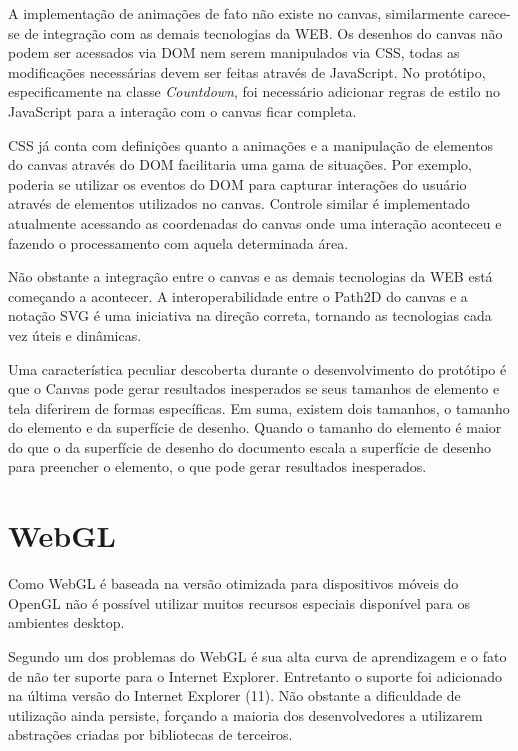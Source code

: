 A implementação de animações de fato não existe no canvas,
similarmente carece-se de integração com as demais tecnologias
da WEB. Os desenhos do canvas não podem ser acessados via DOM nem
serem manipulados via CSS, todas as modificações necessárias devem
ser feitas através de JavaScript. 
No protótipo, especificamente na classe \textit{Countdown}, foi necessário
adicionar regras de estilo no JavaScript para a interação com o canvas
ficar completa.

CSS já conta com definições quanto a animações e a manipulação de
elementos do canvas através do DOM facilitaria uma gama de situações.
Por exemplo, poderia se utilizar os eventos do DOM para capturar
interações do usuário através de elementos utilizados no canvas.
Controle similar é implementado atualmente acessando as coordenadas
do canvas onde uma interação aconteceu e fazendo o processamento com
aquela determinada área.

Não obstante a integração entre o canvas e as demais tecnologias da
WEB está começando a acontecer. A interoperabilidade entre o Path2D
do canvas e a notação SVG é uma iniciativa na direção correta,
tornando as tecnologias cada vez úteis e dinâmicas.

Uma característica peculiar descoberta durante o desenvolvimento
do protótipo é que o Canvas pode gerar resultados inesperados se
seus tamanhos de elemento e tela diferirem de formas específicas. Em
suma, existem dois tamanhos, o tamanho do elemento e da superfície de
desenho. Quando o tamanho do elemento é maior do que o da superfície
de desenho do documento escala a superfície de desenho para preencher o
elemento, o que pode gerar resultados inesperados.

\section{WebGL}

Como WebGL é baseada na versão otimizada para dispositivos móveis do
OpenGL não é possível utilizar muitos recursos especiais disponível
para os ambientes desktop.

Segundo \cite{html5mostwanted} um dos problemas do WebGL é sua alta
curva de aprendizagem e o fato de não ter suporte para o Internet
Explorer. Entretanto o suporte foi adicionado na última versão do
Internet Explorer (11). Não obstante a dificuldade de utilização
ainda persiste, forçando a maioria dos desenvolvedores a utilizarem
abstrações criadas por bibliotecas de terceiros.


